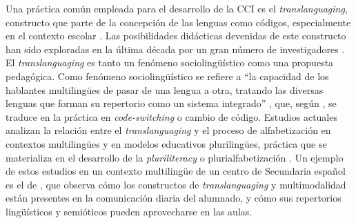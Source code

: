 \documentclass[spanish]{textolivre}
\begin{document}
Una práctica común empleada para el desarrollo de la CCI es el \textit{translanguaging},  constructo que parte de la concepción de las lenguas como códigos, especialmente en el contexto escolar \cite{garcia_translanguaging_2020}. Las posibilidades didácticas devenidas de este constructo han sido exploradas en la última década por un gran número de investigadores \cite{canagarajah_translanguaging_2011,cardenas_curiel_imagining_2021,cenoz_minority_2017,garcia_translanguaging_2020}. El \textit{translanguaging} es tanto un fenómeno sociolingüístico como una propuesta pedagógica. Como fenómeno sociolingüístico se refiere a “la capacidad de los hablantes multilingües de pasar de una lengua a otra, tratando las diversas lenguas que forman su repertorio como un sistema integrado” \cite[p. 401, Traducción de las autoras]{canagarajah_translanguaging_2011}, que, según \textcite{garcia_translanguaging_2020}, se traduce en la práctica en \textit{code-switching} o cambio de código. Estudios actuales analizan la relación entre el \textit{translanguaging} y el proceso de alfabetización en contextos multilingües y en modelos educativos plurilingües, práctica que se materializa en el desarrollo de la \textit{pluriliteracy} o plurialfabetización \cite{coyle_beyond_2021,meyer_pluriliteracies_2015}. Un ejemplo de estos estudios en un contexto multilingüe de un centro de Secundaria español es el de \textcite{martinez_etxarri_translanguaging_2022}, que observa cómo los constructos de \textit{translanguaging} y multimodalidad están presentes en la comunicación diaria del alumnado, y cómo sus repertorios lingüísticos y semióticos pueden aprovecharse en las aulas. 
\end{document}
